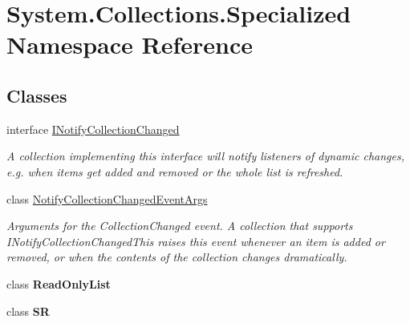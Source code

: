 \hypertarget{namespace_system_1_1_collections_1_1_specialized}{}\section{System.\+Collections.\+Specialized Namespace Reference}
\label{namespace_system_1_1_collections_1_1_specialized}
\subsection*{Classes}
\begin{DoxyCompactItemize}
\item 
interface \hyperlink{interface_system_1_1_collections_1_1_specialized_1_1_i_notify_collection_changed}{I\+Notify\+Collection\+Changed}
\begin{DoxyCompactList}\small\item\em A collection implementing this interface will notify listeners of dynamic changes, e.\+g. when items get added and removed or the whole list is refreshed. \end{DoxyCompactList}\item 
class \hyperlink{class_system_1_1_collections_1_1_specialized_1_1_notify_collection_changed_event_args}{Notify\+Collection\+Changed\+Event\+Args}
\begin{DoxyCompactList}\small\item\em Arguments for the Collection\+Changed event. A collection that supports I\+Notify\+Collection\+Changed\+This raises this event whenever an item is added or removed, or when the contents of the collection changes dramatically. \end{DoxyCompactList}\item 
class {\bfseries Read\+Only\+List}
\item 
class {\bfseries SR}
\end{DoxyCompactItemize}
